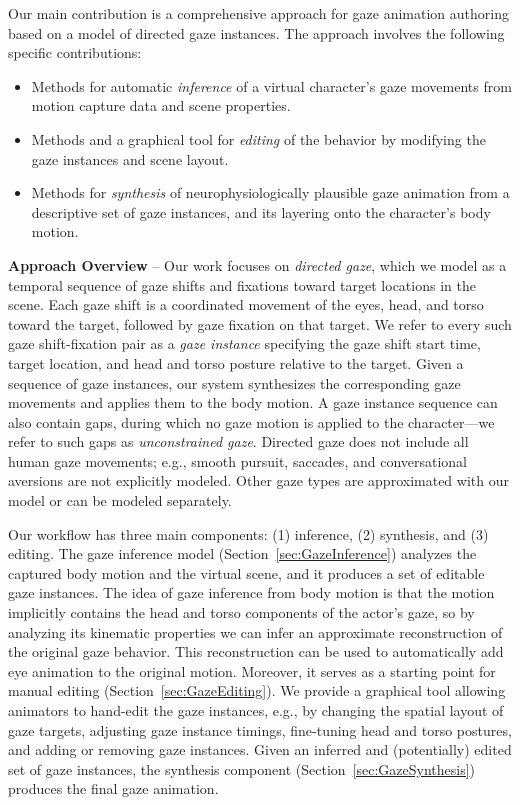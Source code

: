 Our main contribution is a comprehensive approach for gaze animation authoring based on a model of directed gaze instances. The approach involves the following specific contributions:

\begin{itemize}
\item Methods for automatic \emph{inference} of a virtual character's gaze movements from motion capture data and scene properties.
\item Methods and a graphical tool for \emph{editing} of the behavior by modifying the gaze instances and scene layout.
\item Methods for \emph{synthesis} of neurophysiologically plausible gaze animation from a descriptive set of gaze instances, and its layering onto the character's body motion.
\end{itemize}

\noindent\textbf{Approach Overview} -- Our work focuses on \emph{directed gaze}, which we model as a temporal sequence of gaze shifts and fixations toward target locations in the scene. Each gaze shift is a coordinated movement of the eyes, head, and torso toward the target, followed by gaze fixation on that target. We refer to every such gaze shift-fixation pair as a \emph{gaze instance} specifying the gaze shift start time, target location, and head and torso posture relative to the target. Given a sequence of gaze instances, our system synthesizes the corresponding gaze movements and applies them to the body motion. A gaze instance sequence can also contain gaps, during which no gaze motion is applied to the character---we refer to such gaps as \emph{unconstrained gaze}.
Directed gaze does not include all human gaze movements; e.g., smooth pursuit, saccades, and conversational aversions are not explicitly modeled. Other gaze types are approximated with our model or can be modeled separately.

Our workflow has three main components: (1) inference, (2) synthesis, and (3) editing. The gaze inference model (Section~\ref{sec:GazeInference}) analyzes the captured body motion and the virtual scene, and it produces a set of editable gaze instances. The idea of gaze inference from body motion is that the motion implicitly contains the head and torso components of the actor's gaze, so by analyzing its kinematic properties we can infer an approximate reconstruction of the original gaze behavior. This reconstruction can be used to automatically add eye animation to the original motion. Moreover, it serves as a starting point for manual editing (Section~\ref{sec:GazeEditing}). We provide a graphical tool allowing animators to hand-edit the gaze instances, e.g., by changing the spatial layout of gaze targets, adjusting gaze instance timings, fine-tuning head and torso postures, and adding or removing gaze instances. Given an inferred and (potentially) edited set of gaze instances, the synthesis component (Section~\ref{sec:GazeSynthesis}) produces the final gaze animation. 